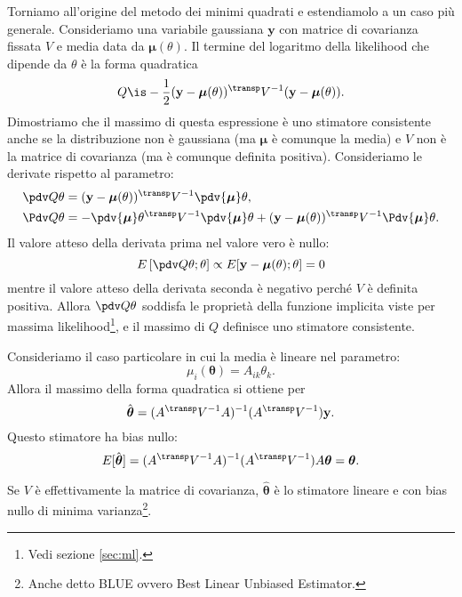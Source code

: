 Torniamo all'origine del metodo dei minimi quadrati e estendiamolo a un caso più generale.
Consideriamo una variabile gaussiana $\mathbf y$ con matrice di covarianza fissata $V$ e media data da $\boldsymbol\mu(\theta)$.
Il termine del logaritmo della likelihood che dipende da $\theta$ è la forma quadratica
\begin{equation*}
	Q \is -\frac 12 (\mathbf y - \boldsymbol\mu(\theta))^\transp V^{-1} (\mathbf y - \boldsymbol\mu(\theta)).
\end{equation*}
Dimostriamo che il massimo di questa espressione è uno stimatore consistente
anche se la distribuzione non è gaussiana (ma $\boldsymbol\mu$ è comunque la media)
e $V$ non è la matrice di covarianza (ma è comunque definita positiva).
Consideriamo le derivate rispetto al parametro:
\begin{align*}
	\pdv Q\theta
	&= (\mathbf y - \boldsymbol\mu(\theta))^\transp V^{-1} \pdv{\boldsymbol\mu}\theta, \\
	\Pdv Q\theta
	&= - \pdv{\boldsymbol\mu}\theta^\transp V^{-1} \pdv{\boldsymbol\mu}\theta
	+ (\mathbf y - \boldsymbol\mu(\theta))^\transp V^{-1} \Pdv{\boldsymbol\mu}\theta.
\end{align*}
Il valore atteso della derivata prima nel valore vero è nullo:
\begin{equation*}
	E\left[\pdv Q\theta;\theta\right]
	\propto E[\mathbf y - \boldsymbol\mu(\theta);\theta] = 0
\end{equation*}
mentre il valore atteso della derivata seconda è negativo perché $V$ è definita positiva.
Allora $\pdv Q\theta$ soddisfa le proprietà della funzione implicita viste per massima likelihood\footnote{Vedi sezione \ref{sec:ml}.},
e il massimo di $Q$ definisce uno stimatore consistente.

Consideriamo il caso particolare in cui la media è lineare nel parametro:
\begin{equation*}
	\mu_i(\boldsymbol\theta) = A_{ik} \theta_k.
\end{equation*}
Allora il massimo della forma quadratica si ottiene per
\begin{equation*}
	\hat{\boldsymbol\theta} = (A^\transp V^{-1} A)^{-1} (A^\transp V^{-1}) \mathbf y.
\end{equation*}
Questo stimatore ha bias nullo:
\begin{equation*}
	E[\hat{\boldsymbol\theta}]
	= (A^\transp V^{-1} A)^{-1} (A^\transp V^{-1}) A \boldsymbol\theta
	= \boldsymbol\theta.
\end{equation*}
\begin{fact}
	Se $V$ è effettivamente la matrice di covarianza,
	$\hat{\boldsymbol\theta}$ è lo stimatore lineare e con bias nullo di minima varianza\footnote{Anche detto BLUE ovvero Best Linear Unbiased Estimator.}.
\end{fact}

